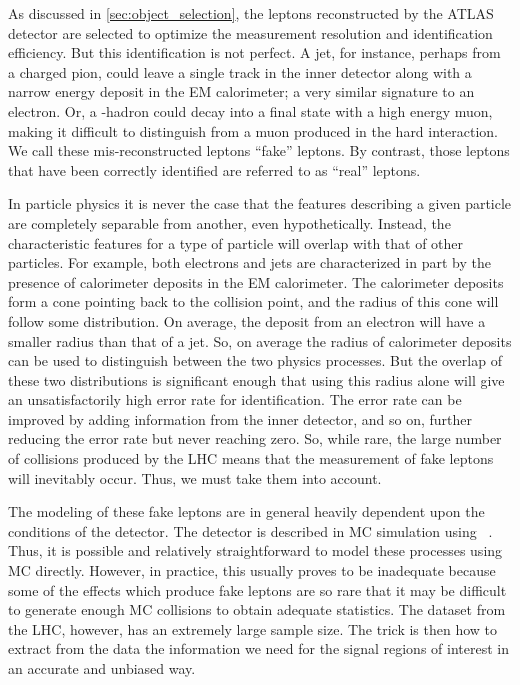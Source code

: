 


As discussed in \sec\ref{sec:object_selection},
the leptons reconstructed by the ATLAS detector are selected
to optimize the measurement resolution and identification efficiency.
But this identification is not perfect. A jet,
for instance, perhaps from a charged pion, could leave a single
track in the inner detector along with a narrow energy deposit in the
EM calorimeter; a very similar signature to an electron. Or, 
a \bee-hadron could decay into a final state with a high energy muon,
making it difficult to distinguish from a muon produced in the hard interaction.
We call these mis-reconstructed leptons ``fake'' leptons. 
By contrast, those leptons that have been correctly identified are 
referred to as ``real'' leptons.

In particle physics it is 
never the case that the features describing 
a given particle are completely separable
from another, even hypothetically. Instead,
the characteristic features for a type of particle will 
overlap with that of other particles. For example, both electrons
and jets are characterized in part by the presence of calorimeter
deposits in the EM calorimeter. 
The calorimeter deposits form a cone 
pointing back to the collision point, and the radius
of this cone will follow some distribution. On average,
the deposit from an electron will have a smaller radius 
than that of a jet. So, on average the radius of calorimeter
deposits can be used to distinguish between the two physics
processes. But the overlap of these two distributions is 
significant enough that using this radius alone
will give an unsatisfactorily high error rate for identification.
The error rate can be improved by adding information 
from the inner detector, and so on, further reducing
the error rate but never reaching zero.
So, while rare, the large number of collisions produced by the LHC
means that the measurement of fake leptons will inevitably occur. 
Thus, we must take them into account.

The modeling of these fake leptons are in general 
heavily dependent upon the conditions of the detector. 
The detector is described in MC simulation using \geant~\cite{Agostinelli:2002hh}.
Thus, it is possible and relatively straightforward 
to model these processes using MC directly.
However, in practice, this usually proves to be inadequate
because some of the effects which produce fake leptons 
are so rare that it may be difficult to generate enough MC
collisions to obtain adequate statistics.
The dataset from the LHC, however, has an extremely large sample size.
The trick is then how to extract from the data the information we need
for the signal regions of interest in an accurate and unbiased way.


